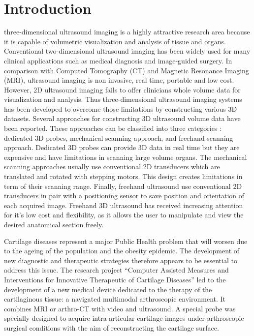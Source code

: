 \documentclass[12pt,journal,compsoc]{IEEEtran}
\begin{document}
\section{Introduction}

 three-dimensional ultrasound imaging is a highly attractive research area because it is capable of volumetric visualization and analysis of tissue and organs. Conventional two-dimensional ultrasound imaging has been widely used for many clinical applications such as medical diagnosis and image-guided surgery. In comparison with Computed Tomography (CT) and Magnetic Resonance Imaging (MRI), ultrasound imaging is non invasive, real time, portable and low cost. However, 2D ultrasound imaging fails to offer clinicians whole volume data for visualization and analysis. Thus three-dimensional ultrasound imaging systems has been developed to overcome those limitations by constructing various 3D datasets. Several approaches for constructing 3D ultrasound volume data have been reported. These approaches can be classified into three categories : dedicated 3D probes, mechanical scanning approach, and freehand scanning approach. 
Dedicated 3D probes can provide 3D data in real time but they are expensive and have limitations in scanning large volume organs.
The mechanical scanning approaches usually use conventional 2D transducers which are translated and rotated with stepping motors. This design creates limitations in term of their scanning range. 
Finally, freehand ultrasound use conventional 2D transducers in pair with a positioning sensor to save position and orientation of each acquired image.
Freehand 3D ultrasound has received increasing attention for it's low cost and flexibility, as it allows the user to manipulate and view the desired anatomical section freely.

Cartilage diseases represent a major Public Health problem that will worsen due to the ageing of the population and the obesity epidemic.
The development of new diagnostic and therapeutic strategies therefore appears to be essential to address this issue.
The research project “Computer Assisted Measures and Interventions for Innovative Therapeutic of Cartilage Diseases” led to the development of a new medical device dedicated to the therapy of the cartilaginous tissue: a navigated multimodal arthroscopic environment.
It combines MRI or arthro-CT with video and ultrasound. 
A special probe was specially designed to acquire intra-articular cartilage images under arthroscopic surgical conditions with the aim of reconstructing the cartilage surface.
\end{document}
